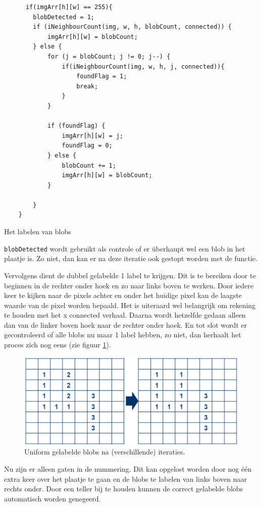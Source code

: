 \begin{listing}
    \begin{verbatim}
      if(imgArr[h][w] == 255){
        blobDetected = 1;
        if (iNeighbourCount(img, w, h, blobCount, connected)) {
            imgArr[h][w] = blobCount;
        } else {
            for (j = blobCount; j != 0; j--) {
                if(iNeighbourCount(img, w, h, j, connected)){
                    foundFlag = 1;
                    break;
                }
            }

            if (foundFlag) {
                imgArr[h][w] = j;
                foundFlag = 0;
            } else {
                blobCount += 1;
                imgArr[h][w] = blobCount;
            }

        }
    }
    \end{verbatim}
    \caption{Het labelen van blobs}
    \label{lst:labeling1}
\end{listing}

\texttt{blobDetected} wordt gebruikt als controle of er überhaupt wel een blob
in het plaatje is. Zo niet, dan kan er na deze iteratie ook gestopt worden met
de functie.

Vervolgens dient de dubbel gelabelde 1 label te krijgen. Dit is te bereiken
door te beginnen in de rechter onder hoek en zo naar links boven te werken.
Door iedere keer te kijken naar de pixels achter en onder het huidige pixel
kan de laagste waarde van de pixel worden bepaald. Het is uiteraard wel
belangrijk om rekening te houden met het x connected verhaal.
Daarna wordt hetzelfde gedaan alleen dan van de linker boven hoek naar de
rechter onder hoek. En tot slot wordt er gecontroleerd of alle blobs nu
maar 1 label hebben, zo niet, dan herhaalt het proces zich nog eens (zie
figuur \ref{fig:lbstep2}).

\begin{figure}
    \begin{center}
        \includegraphics[scale=0.4]{figures/label_blobs_step2.png}
    \end{center}
    \caption{Uniform gelabelde blobs na (verschillende) iteraties.}
    \label{fig:lbstep2}
\end{figure}

Nu zijn er alleen gaten in de nummering. Dit kan opgelost worden door nog
één extra keer over het plaatje te gaan en de blobs te labelen van links
boven naar rechts onder. Door een teller bij te houden kunnen de correct
gelabelde blobs automatisch worden genegeerd.
